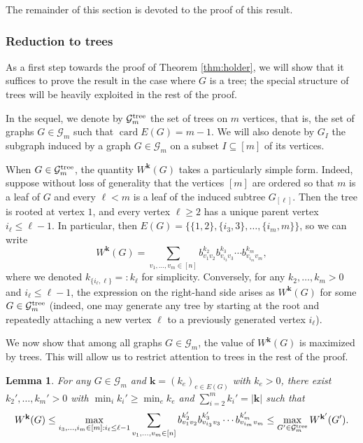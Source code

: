 \documentclass[10pt,reqno]{amsart}
\newtheorem{lem}[thm]{Lemma}
\theoremstyle{definition}
\numberwithin{equation}{section}
\numberwithin{figure}{section}
\numberwithin{table}{section}
\newcommand{\card}{\mathop{\mathrm{card}}}
\begin{document}
The remainder of this section is devoted to the proof of this result.

\subsubsection{Reduction to trees}

As a first step towards the proof of Theorem \ref{thm:holder}, we will 
show that it suffices to prove the result in the case where $G$ is a tree; 
the special structure of trees will be heavily exploited in the rest
of the proof.

In the sequel, we denote by $\mathcal{G}_m^{\rm tree}$ the set of trees 
on $m$ vertices, that is, the set of graphs $G\in\mathcal{G}_m$ such that 
$\card E(G)=m-1$. We will also denote by $G_I$ the subgraph induced by a 
graph $G\in\mathcal{G}_m$ on a subset $I\subseteq[m]$ of its vertices.

When $G\in\mathcal{G}_m^{\rm tree}$, the quantity $W^{\mathbf{k}}(G)$
takes a particularly simple form. Indeed, suppose without loss of 
generality that the vertices $[m]$ are ordered so that $m$ is a leaf of
$G$ and every $\ell<m$ is a leaf of the induced subtree $G_{[\ell]}$.
Then the tree is rooted at vertex $1$, and every vertex $\ell\ge 2$ has a 
unique parent vertex $i_\ell\le \ell-1$. In particular, then
$E(G)=\{\{1,2\},\{i_3,3\},\ldots,\{i_m,m\}\}$, so we can write
$$
	W^{\mathbf{k}}(G) =
	\sum_{v_1,\ldots,v_m\in[n]}
	b_{v_1v_2}^{k_2}b_{v_{i_3}v_3}^{k_3}\cdots
	b_{v_{i_m}v_m}^{k_m},
$$
where we denoted $k_{\{i_\ell,\ell\}} =: k_{\ell}$ for simplicity.
Conversely, for any $k_2,\ldots,k_m>0$ and
$i_\ell\le \ell-1$, the expression on the right-hand side arises as
$W^{\mathbf{k}}(G)$ for some $G\in\mathcal{G}_m^{\rm tree}$ (indeed,
one may generate any tree by starting at the root and repeatedly 
attaching a new vertex $\ell$ to a previously generated vertex
$i_\ell$).

We now show that among all graphs $G\in\mathcal{G}_m$, the value 
of $W^{\mathbf{k}}(G)$ is maximized by trees. This will allow us to 
restrict attention to trees in the rest of the proof.

\begin{lem}
\label{lem:tree}
For any $G\in\mathcal{G}_m$ and $\mathbf{k}=(k_e)_{e\in E(G)}$ with
$k_e>0$, there exist
$k_2',\ldots,k_m'>0$ with $\min_ik_i'\ge \min_ek_e$ and
$\sum_{i=2}^mk_i'=|\mathbf{k}|$ such that
$$
	W^{\mathbf{k}}(G) \le
	\max_{i_3,\ldots,i_m\in[m]:i_\ell\le \ell-1}
	\sum_{v_1,\ldots,v_m\in[n]}
        b_{v_1v_2}^{k_2'}b_{v_{i_3}v_3}^{k_3'}\cdots
        b_{v_{i_m}v_m}^{k_m'} \le
	\max_{G'\in\mathcal{G}_m^{\rm tree}}
	W^{\mathbf{k'}}(G').
$$
\end{lem}
\end{document}
